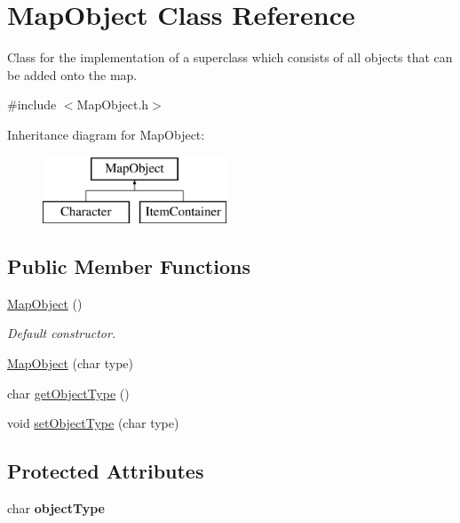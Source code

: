 \hypertarget{class_map_object}{}\section{Map\+Object Class Reference}
\label{class_map_object}


Class for the implementation of a superclass which consists of all objects that can be added onto the map.  




{\ttfamily \#include $<$Map\+Object.\+h$>$}

Inheritance diagram for Map\+Object\+:\begin{figure}[H]
\begin{center}
\leavevmode
\includegraphics[height=2.000000cm]{class_map_object}
\end{center}
\end{figure}
\subsection*{Public Member Functions}
\begin{DoxyCompactItemize}
\item 
\hypertarget{class_map_object_a568754515cc72ce0861d30c3040d26d2}{}\label{class_map_object_a568754515cc72ce0861d30c3040d26d2} 
\hyperlink{class_map_object_a568754515cc72ce0861d30c3040d26d2}{Map\+Object} ()
\begin{DoxyCompactList}\small\item\em Default constructor. \end{DoxyCompactList}\item 
\hyperlink{class_map_object_a6d1c6e3754501b52af5a79a3322f0fba}{Map\+Object} (char type)
\item 
char \hyperlink{class_map_object_af740b1d1e4c4bbdb8727eeadcea0d008}{get\+Object\+Type} ()
\item 
void \hyperlink{class_map_object_a8a0fb292fa5e3262f304baeaa5db39fc}{set\+Object\+Type} (char type)
\end{DoxyCompactItemize}
\subsection*{Protected Attributes}
\begin{DoxyCompactItemize}
\item 
\hypertarget{class_map_object_ae39a5ef412aa349b2e9b329fad940b2d}{}\label{class_map_object_ae39a5ef412aa349b2e9b329fad940b2d} 
char {\bfseries object\+Type}
\end{DoxyCompactItemize}
